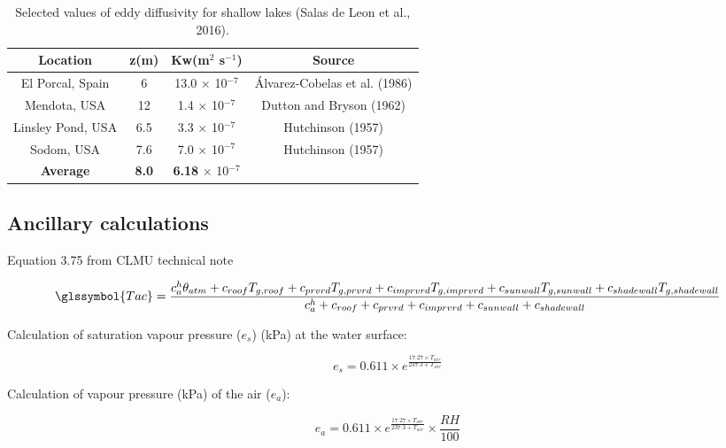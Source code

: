 \documentclass[final,3p,times,authoryear]{elsarticle}
\begin{document}
\begin{table}[!htbp]
\caption{Selected values of eddy diffusivity for shallow lakes (Salas de Leon et al., 2016).}  
\label{tab:eddydiff}
  \begin{tabular}{   c  c  c c} 
	\hline  \textbf{Location} & \textbf{z(m)} & \textbf{Kw(m$^{2}$ s$^{-1}$)} & \textbf{Source} \\ \hline
El Porcal, Spain & 6 & 13.0 $\times$ 10$^{-7}$ & \'{A}lvarez-Cobelas et al. (1986)  \\ 
Mendota, USA &12&1.4 $\times$ 10$^{-7}$&Dutton and Bryson (1962)\\ 
Linsley Pond, USA&6.5&3.3 $\times$ 10$^{-7}$&Hutchinson (1957)\\ 
Sodom, USA&7.6&7.0 $\times$ 10$^{-7}$&Hutchinson (1957)\\ \hline
\textbf{Average}&\textbf{8.0}&\textbf{6.18} $\times$ 10$^{-7}$&\\ \hline
	
  \end{tabular} 
\end{table}




\subsection{Ancillary calculations}\label{app:calc}  


 
Equation 3.75 from CLMU technical note \citep{Oleson2010}

\begin{equation} 
\glssymbol{Tac} = \frac {c^{h}_{a}\theta_{atm} + c_{roof}T_{g,roof} + c_{prvrd}T_{g,prvrd} + c_{imprvrd}T_{g,imprvrd} + c_{sunwall}T_{g,sunwall} + c_{shadewall}T_{g,shadewall}}
                        {c^{h}_{a} + c_{roof} + c_{prvrd} + c_{imprvrd} + c_{sunwall} + c_{shadewall}}
\label{eq:clmu375} \end{equation}


Calculation of saturation vapour pressure ($e_{s}$) (kPa) at the water surface:

\begin{equation} 
e_{s} = 0.611 \times e^{ \frac{17.27 \times T_{wtr}}{237.3 + T_{wtr}} }
\label{eq:satva} \end{equation}


Calculation of vapour pressure (kPa) of the air ($e_{a}$):

\begin{equation} 
e_{a} =0.611 \times e^{ \frac{17.27 \times T_{wtr}}{237.3 + T_{wtr}} } \times \frac{RH}{100}
\label{eq:xx} \end{equation}
\end{document}
